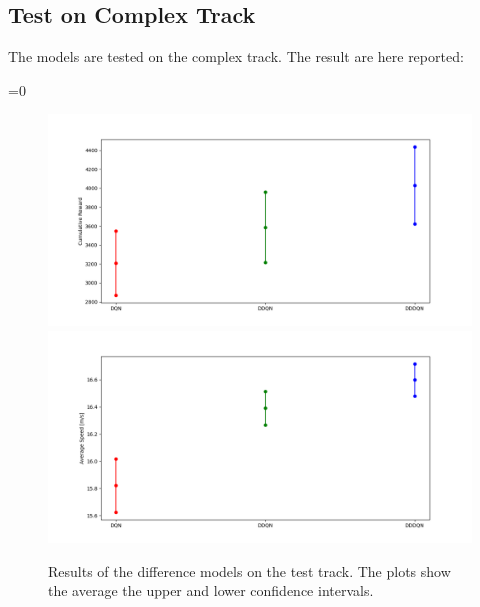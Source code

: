 \documentclass[14pt]{extarticle}
\def\sp{\vspace{5pt}}
\newcounter{debug}
\begin{document}
\begin{flushleft}
\subsection{Test on Complex Track}
\sp
The models are tested on the complex track. The result are here reported:

\ifnum\value{debug}=0 {
	\begin{figure}[H]
    		\centering\includegraphics[width=1\textwidth]{./Image/Results/Test/rewards.png}
    		\vspace{-5mm}
    		\centering\includegraphics[width=1\textwidth]{./Image/Results/Test/speeds.png}
		\caption{Results of the difference models on the test track. The plots show the average the upper and lower confidence intervals.}
	\end{figure}
	}\fi
	
\begin{table}[H]
		\centering
		\caption{Result obtained during the evaluation of the models on the complex track.}
		\label{tab:table-test}
	\end{table}
	

\end{flushleft}
\end{document}
